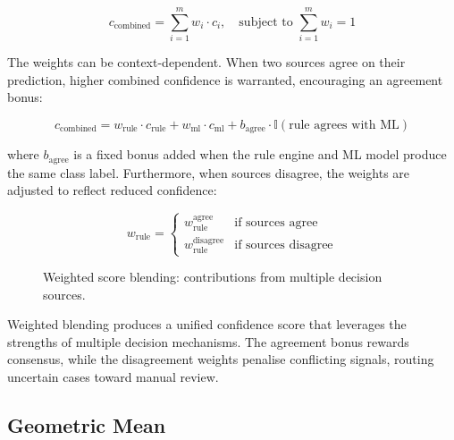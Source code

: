 \documentclass[10pt,a4paper]{article}
\begin{document}
\begin{equation}
c_{\text{combined}} = \sum_{i=1}^{m} w_i \cdot c_i, \quad \text{subject to } \sum_{i=1}^{m} w_i = 1
\label{eq:weighted-blending}
\end{equation}

The weights can be context-dependent. When two sources agree on their prediction, higher combined confidence is warranted, encouraging an agreement bonus:

\begin{equation}
c_{\text{combined}} = w_{\text{rule}} \cdot c_{\text{rule}} + w_{\text{ml}} \cdot c_{\text{ml}} + b_{\text{agree}} \cdot \mathbb{I}(\text{rule agrees with ML})
\label{eq:agreement-bonus}
\end{equation}

where $b_{\text{agree}}$ is a fixed bonus added when the rule engine and ML model produce the same class label. Furthermore, when sources disagree, the weights are adjusted to reflect reduced confidence:

\begin{equation}
w_{\text{rule}} = \begin{cases} w_{\text{rule}}^{\text{agree}} & \text{if sources agree} \\ w_{\text{rule}}^{\text{disagree}} & \text{if sources disagree} \end{cases}
\label{eq:conditional-weights}
\end{equation}

\begin{figure}[H]
    \centering
    \caption{Weighted score blending: contributions from multiple decision sources.}
    \label{fig:weighted-blending}
\end{figure}

Weighted blending produces a unified confidence score that leverages the strengths of multiple decision mechanisms. The agreement bonus rewards consensus, while the disagreement weights penalise conflicting signals, routing uncertain cases toward manual review.

\subsection{Geometric Mean}
\label{sec:geometric-mean}
\end{document}
